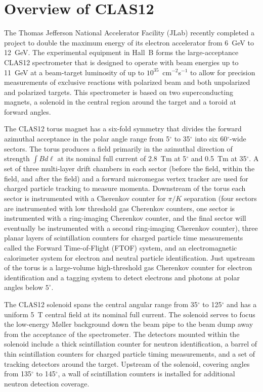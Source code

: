\documentclass[final,3p,twocolumn]{elsarticle}
\begin{document}
\section{Overview of CLAS12}

The Thomas Jefferson National Accelerator Facility (JLab) recently completed a project to double
the maximum energy of its electron accelerator from 6~GeV to 12~GeV. The experimental equipment
in Hall~B forms the large-acceptance CLAS12 spectrometer that is designed to operate with beam
energies up to 11~GeV at a beam-target luminosity of up to $10^{35}$~cm$^{-2}$s$^{-1}$ to allow for
precision measurements of exclusive reactions with polarized beam and both unpolarized and polarized
targets. This spectrometer is based on two superconducting magnets, a solenoid in the central region
around the target and a toroid at forward angles. 

The CLAS12 torus magnet has a six-fold symmetry that divides the forward azimuthal acceptance in the
polar angle range from 5$^\circ$ to 35$^\circ$ into six 60$^\circ$-wide sectors. The torus produces a field
primarily in the azimuthal direction of strength $\int \!B d\ell$ at its nominal full current of 2.8~Tm at
5$^\circ$ and 0.5~Tm at 35$^\circ$. A set of three multi-layer drift chambers in each sector (before the
field, within the field, and after the field) and a forward micromegas vertex tracker are used for charged
particle tracking to measure momenta. Downstream of the torus each sector is instrumented with a Cherenkov
counter for $\pi/K$ separation (four sectors are instrumented with low threshold gas Cherenkov counters, one
sector is instrumented with a ring-imaging Cherenkov counter, and the final sector will eventually be
instrumented with a second ring-imaging Cherenkov counter), three planar layers of scintillation counters for
charged particle time measurements called the Forward Time-of-Flight (FTOF) system, and an electromagnetic
calorimeter system for electron and neutral particle identification. Just upstream of the torus is a large-volume
high-threshold gas Cherenkov counter for electron identification and a tagging system to detect electrons and
photons at polar angles below $5^\circ$.

The CLAS12 solenoid spans the central angular range from 35$^\circ$ to 125$^\circ$ and has a uniform 5~T
central field at its nominal full current. The solenoid serves to focus the low-energy M{\o}ller background down
the beam pipe to the beam dump away from the acceptance of the spectrometer. The detectors mounted within
the solenoid include a thick scintillation counter for neutron identification, a barrel of thin scintillation counters
for charged particle timing measurements, and a set of tracking detectors around the target. Upstream of the
solenoid, covering angles from 135$^\circ$ to 145$^\circ$, a wall of scintillation counters is installed for
additional neutron detection coverage.
\end{document}
